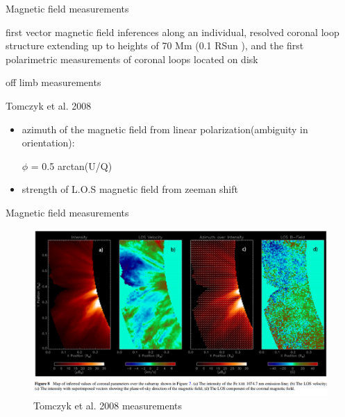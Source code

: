 \documentclass{beamer}
\begin{document}
\begin{frame}{Magnetic field measurements}

 first vector
magnetic field inferences along an individual, resolved coronal
loop structure extending up to heights of 70 Mm (0.1 RSun ), and
the first polarimetric measurements of coronal loops located on
disk

off limb measurements

Tomczyk et al. 2008
 
\begin{itemize}
\item azimuth of the magnetic field from linear polarization(ambiguity in orientation): 

$\phi$ = 0.5 arctan(U/Q)



\item strength of L.O.S  magnetic field from zeeman shift
\end{itemize}

\end{frame}

\begin{frame}{Magnetic field measurements}
 
\begin{figure}[H]
 \centering
 \includegraphics[scale=0.35]{t1.png}
\caption{Tomczyk et al. 2008 measurements}
\end{figure}
\end{frame}
\end{document}
